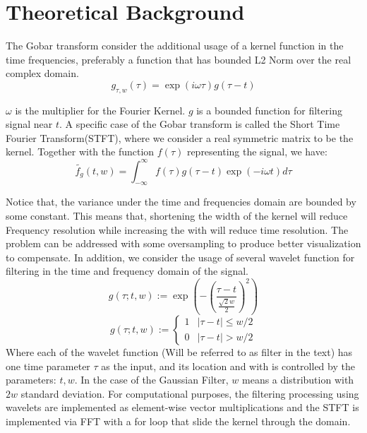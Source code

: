 \documentclass{article}
\begin{document}
\section{Theoretical Background}
    \par\hspace{1.1em}
    The Gobar transform consider the additional usage of a kernel function in the time frequencies, preferably a function that has bounded L2 Norm over the real complex domain.
    \begin{equation*}\tag{1}\label{eqn:1}
        g_{\tau, w}(\tau) = \exp(i\omega \tau)g(\tau - t)
    \end{equation*}
    \par
    $\omega$ is the multiplier for the Fourier Kernel. $g$ is a bounded function for filtering signal near $t$. A specific case of the Gobar transform is called the Short Time Fourier Transform(STFT), where we consider a real symmetric matrix to be the kernel. Together with the function $f(\tau)$ representing the signal, we have: 
    \begin{equation*}\tag{2}\label{eqn:2}
        \widetilde{f_g}(t, w) = \int_{-\infty}^{\infty} f(\tau)g(\tau - t)\exp(-i\omega t) d\tau
    \end{equation*}
    \par
    Notice that, the variance under the time and frequencies domain are bounded by some constant. This means that, shortening the width of the kernel will reduce Frequency resolution while increasing the with will reduce time resolution. %
    The problem can be addressed with some oversampling to produce better visualization to compensate. In addition, we consider the usage of several wavelet function for filtering in the time and frequency domain of the signal. 
    \begin{equation*}\tag{wavelet.G}\label{eqn:wavelet.G}
        g(\tau; t, w):=\exp \left(
            -
            \left(
                \frac{\tau - t}{\frac{\sqrt{2}w}{2}}
            \right)^2
        \right)
    \end{equation*}
    \begin{equation*}\tag{wavelet.S}\label{eqn:wavelet.S}
        g(\tau; t, w):=
        \begin{cases}
            1 & |\tau - t| \le w/2 \\ 0 & |\tau - t| > w/2
        \end{cases}
    \end{equation*}
    Where each of the wavelet function (Will be referred to as filter in the text) has one time parameter $\tau$ as the input, and its location and with is controlled by the parameters: $t, w$. In the case of the Gaussian Filter, $w$ means a distribution with $2w$ standard deviation. For computational purposes, the filtering processing using wavelets are implemented as element-wise vector multiplications and the STFT is implemented via FFT with a for loop that slide the kernel through the domain.
\end{document}
